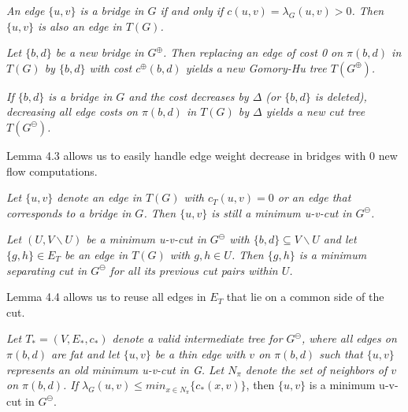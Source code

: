     \vspace{4mm}
     \textit{An edge $\{u,v\}$ is a bridge in $G$ if and only if $c(u,v) = \lambda_G(u,v) >0$. Then $\{u,v\}$ is also an edge in $T(G)$.}

    \vspace{5mm}
     \textit{Let $\{b,d\}$ be a new bridge in $G^\oplus$. Then replacing an edge of cost 0 on $\pi (b,d)$ in $T(G)$ by $\{b,d\}$ with cost $c^\oplus (b,d)$ yields a new Gomory-Hu tree $T(G^\oplus)$.}

    \vspace{5mm}
     \textit{If $\{b,d\}$ is a bridge in $G$ and the cost decreases by $\Delta$ (or $\{b,d\}$ is deleted), decreasing all edge costs on $\pi (b,d)$ in $T(G)$ by $\Delta$ yields a new cut tree $T(G^\ominus)$.}
    \vspace{3mm}

    \noindent Lemma 4.3 allows us to easily handle edge weight decrease in bridges with 0 new flow computations.
    
    \vspace{5mm}
     \textit{Let $\{u,v\}$ denote an edge in $T(G)$ with $c_T(u,v)=0$ or an edge that corresponds to a bridge in $G$. Then $\{u,v\}$ is still a minimum u-v-cut in $G^\ominus$.}

    \vspace{5mm}
     \textit{Let $(U,V\backslash U)$ be a minimum u-v-cut in $G^\ominus$ with $\{b,d\}\subseteq V\backslash U$ and let $\{g,h\}\in E_T$ be an edge in $T(G)$ with $g,h\in U$. Then $\{g,h\}$ is a minimum separating cut in $G^\ominus$ for all its previous cut pairs within $U$.}
    \vspace{3mm}

    \noindent Lemma 4.4 allows us to reuse all edges in $E_T$ that lie on a common side of the cut.
    
    \vspace{5mm}
     \textit{Let $T_* = (V,E_*,c_*)$ denote a valid intermediate tree for $G^\ominus$, where all edges on $\pi (b,d)$ are fat and let $\{u,v\}$ be a thin edge with $v$ on $\pi (b,d)$ such that $\{u,v\}$ represents an old minimum u-v-cut in G. Let $N_\pi$ denote the set of neighbors of $v$ on $\pi (b,d)$. If $\lambda_G (u,v) \le min_{x\in N_\pi}\{c_*(x,v)\}$}, then $\{u,v\}$ is a minimum u-v-cut in $G^\ominus$.

